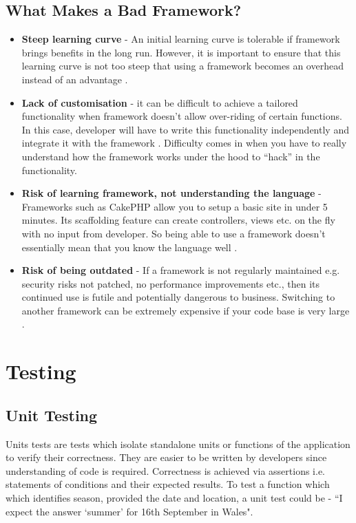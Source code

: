 \subsection{What Makes a Bad Framework?}
\label{subsec:what-makes-a-bad-framework}
\begin{itemize}
 	\item \textbf{Steep learning curve} - An initial learning curve is tolerable if framework brings benefits in the long run. However, it is important to ensure that this learning curve is not too steep that using a framework becomes an overhead instead of an advantage \cite{OSTraining}.
    \item \textbf{Lack of customisation } - it can be difficult to achieve a tailored functionality when framework doesn’t allow over-riding of certain functions. In this case, developer will have to write this functionality independently and integrate it with the framework \cite{Quora}. Difficulty comes in when you have to really understand how the framework works under the hood to “hack” in the functionality.
    \item \textbf{Risk of learning framework, not understanding the language} - Frameworks such as CakePHP allow you to setup a basic site in under 5 minutes. Its scaffolding feature can create controllers, views etc. on the fly with no input from developer. So being able to use a framework doesn't essentially mean that you know the language well \cite{Vizteams}.
    \item \textbf{Risk of being outdated} - If a framework is not regularly maintained e.g. security risks not patched, no performance improvements etc., then its continued use is futile and potentially dangerous to business. Switching to another framework can be extremely expensive if your code base is very large \cite{Quora}.
\end{itemize}

\section{Testing}
\label{sec:testing}

\subsection{Unit Testing}
\label{subsec:unit-testing}

Units tests are tests which isolate standalone units or functions of the application to verify their correctness. They are easier to be written by developers since understanding of code is required. Correctness is achieved via assertions i.e. statements of conditions and their expected results. To test a function which which identifies season, provided the date and location, a unit test could be - “I expect the answer ‘summer’ for 16th September in Wales".

